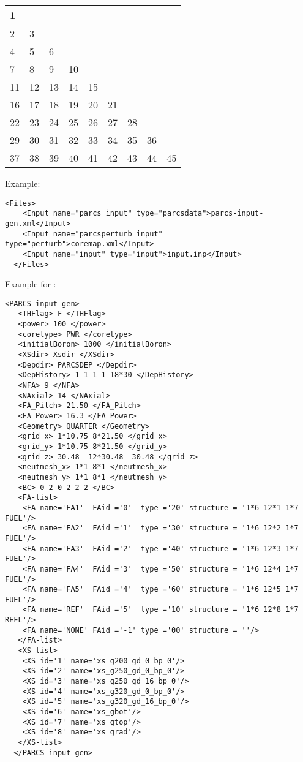 \begin{center}
  \begin{tabular}{ |p{0.5cm}|p{0.5cm}|p{0.5cm}|p{0.5cm}|p{0.5cm}|p{0.5cm}|p{0.5cm}|p{0.5cm}|p{0.5cm}| }
    \hline
    1& & & & & & & &  \\
    \hline
    2&3& & & & & & &  \\
    \hline
    4&5&6& & & & & &  \\
    \hline
    7&8&9&10& & & & &  \\
    \hline
    11&12&13&14&15& & & &  \\
    \hline
    16&17&18&19&20&21& & &  \\
    \hline
    22&23&24&25&26&27&28& & \\
    \hline
    29&30&31&32&33&34&35&36&  \\
    \hline
    37&38&39&40&41&42&43&44&45 \\
    \hline
  \end{tabular}
\end{center}

Example:
  \begin{lstlisting}[style=XML]
  <Files>
    <Input name="parcs_input" type="parcsdata">parcs-input-gen.xml</Input>
    <Input name="parcsperturb_input" type="perturb">coremap.xml</Input>
    <Input name="input" type="input">input.inp</Input>
  </Files>
  \end{lstlisting}

Example for :
  \begin{lstlisting}[style=XML]
  <PARCS-input-gen>
   <THFlag> F </THFlag>
   <power> 100 </power>
   <coretype> PWR </coretype>
   <initialBoron> 1000 </initialBoron>
   <XSdir> Xsdir </XSdir>
   <Depdir> PARCSDEP </Depdir>
   <DepHistory> 1 1 1 1 18*30 </DepHistory>
   <NFA> 9 </NFA>
   <NAxial> 14 </NAxial>
   <FA_Pitch> 21.50 </FA_Pitch>
   <FA_Power> 16.3 </FA_Power>
   <Geometry> QUARTER </Geometry>
   <grid_x> 1*10.75 8*21.50 </grid_x>
   <grid_y> 1*10.75 8*21.50 </grid_y>
   <grid_z> 30.48  12*30.48  30.48 </grid_z>
   <neutmesh_x> 1*1 8*1 </neutmesh_x>
   <neutmesh_y> 1*1 8*1 </neutmesh_y>
   <BC> 0 2 0 2 2 2 </BC>
   <FA-list>
    <FA name='FA1'  FAid ='0'  type ='20' structure = '1*6 12*1 1*7 FUEL'/>
    <FA name='FA2'  FAid ='1'  type ='30' structure = '1*6 12*2 1*7 FUEL'/>
    <FA name='FA3'  FAid ='2'  type ='40' structure = '1*6 12*3 1*7 FUEL'/>
    <FA name='FA4'  FAid ='3'  type ='50' structure = '1*6 12*4 1*7 FUEL'/>
    <FA name='FA5'  FAid ='4'  type ='60' structure = '1*6 12*5 1*7 FUEL'/>
    <FA name='REF'  FAid ='5'  type ='10' structure = '1*6 12*8 1*7 REFL'/>
    <FA name='NONE' FAid ='-1' type ='00' structure = ''/>
   </FA-list>
   <XS-list>
    <XS id='1' name='xs_g200_gd_0_bp_0'/>
    <XS id='2' name='xs_g250_gd_0_bp_0'/>
    <XS id='3' name='xs_g250_gd_16_bp_0'/>
    <XS id='4' name='xs_g320_gd_0_bp_0'/>
    <XS id='5' name='xs_g320_gd_16_bp_0'/>
    <XS id='6' name='xs_gbot'/>
    <XS id='7' name='xs_gtop'/>
    <XS id='8' name='xs_grad'/>
   </XS-list>
  </PARCS-input-gen>

\end{lstlisting}

